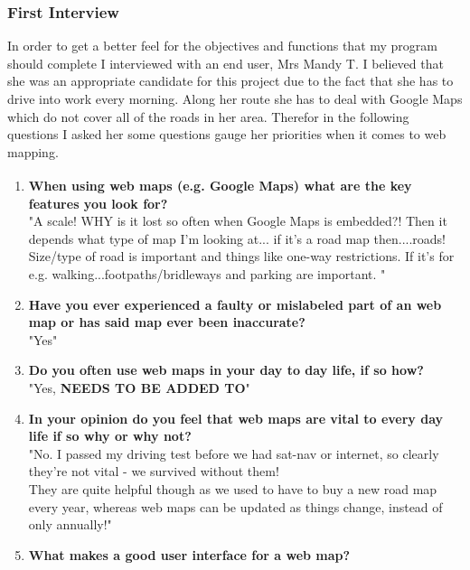 \begin{flushleft}
            \subsubsection{First Interview}
            \large
            In order to get a better feel for the objectives and functions that my program should complete I interviewed with an end user, Mrs Mandy T. I believed that she was an appropriate candidate for this
            project due to the fact that she has to drive into work every morning. Along her route she has to deal with Google Maps which do not cover all of the roads in her area. Therefor in the following questions
            I asked her some questions gauge her priorities when it comes to web mapping.
            \bk
            \begin{enumerate}
                \item {\bf{When using web maps (e.g. Google Maps\textsuperscript{\tiny\textcopyright}) what are the key features you look for?}} \\
                \bk
                "A scale! WHY is it lost so often when Google Maps is embedded?! 
                Then it depends what type of map I'm looking at... if it's a road map then....roads! Size/type of road is important and things like one-way restrictions. 
                If it's for e.g. walking...footpaths/bridleways and parking are important. 
                "
                \item {\bf{Have you ever experienced a faulty or mislabeled part of an web map or has said map ever been inaccurate?}} \\
                \bk
                "Yes"
                \item {\bf{Do you often use web maps in your day to day life, if so how?}} \\
                \bk
                "Yes, \textbf{NEEDS TO BE ADDED TO}"
                \item {\bf{In your opinion do you feel that web maps are vital to every day life if so why or why not? }} \\
                \bk
                "No.  I passed my driving test before we had sat-nav or internet, so clearly they're not vital - we survived without them! \\ 
                They are quite helpful though as we used to have to buy a new road map every year, whereas web maps can be updated as things change, instead of only annually!"
                \item {\bf{What makes a good user interface for a web map?}} \\

\end{enumerate}
\end{flushleft}
